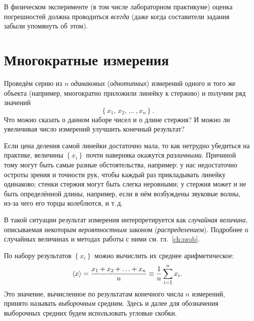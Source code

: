 В физическом эксперименте (в том числе лабораторном практикуме) оценка
погрешностей должна проводиться \emph{всегда}
(даже когда составители задания забыли упомянуть об этом).

\section{Многократные измерения}

Проведём серию из $n$ \emph{одинаковых} (\emph{однотипных}) измерений одного
и того же объекта (например, многократно приложили линейку к стержню) и получим
ряд значений
\[
\left\{ x_{1},\,x_{2},\,\ldots\,,x_{n}\right\} .
\]
Что можно сказать о данном наборе чисел и о длине стержня?
И можно ли увеличивая число измерений улучшить конечный результат?

Если цена деления самой линейки достаточно мала, то как нетрудно убедиться
на практике, величины $\left\{ x_{i}\right\}$ почти наверняка окажутся
\emph{различными}. Причиной тому могут быть
самые разные обстоятельства, например: у нас недостаточно остроты
зрения и точности рук, чтобы каждый раз прикладывать линейку одинаково;
стенки стержня могут быть слегка неровными; у стержня может и не быть
определённой длины, например, если в нём возбуждены звуковые волны,
из-за чего его торцы колеблются, и т.\,д.

В такой ситуации результат измерения интерпретируется как
\emph{случайная величина}, описываемая некоторым \emph{вероятностным} законом
(\emph{распределением}).
Подробнее о случайных величинах и методах работы с ними см. гл.~\ref{ch:prob}.


По набору результатов $\left\{x_i\right\}$ можно вычислить их среднее арифметическое:
\begin{equation}
 \left<x\right>=\frac{x_{1}+x_{2}+\ldots+x_{n}}{n}\equiv\frac{1}{n}\sum\limits
_{i=1}^{n}x_{i}\label{eq:average}.
\end{equation}
Это значение, вычисленное по результатам конечного числа $n$ измерений,
принято называть \emph{выборочным} средним. Здесь и далее для обозначения
выборочных средних будем использовать угловые скобки.

